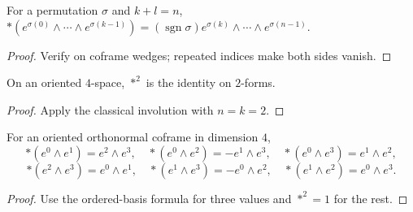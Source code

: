 \begin{proposition}
\label{prop:hodge-star-basis-wedge}





For a permutation $\sigma$ and $k+l=n$, $*(e^{\sigma(0)}\wedge\cdots\wedge e^{\sigma(k-1)})=(\operatorname{sgn}\sigma)e^{\sigma(k)}\wedge\cdots\wedge e^{\sigma(n-1)}$.
\end{proposition}
\begin{proof}

\sketch Verify on coframe wedges; repeated indices make both sides vanish.
\end{proof}

\begin{proposition}
\label{prop:hodge-star-two-involution}





On an oriented $4$-space, $*^2$ is the identity on $2$-forms.
\end{proposition}
\begin{proof}

\sketch Apply the classical involution with $n=k=2$.
\end{proof}

\begin{proposition}
\label{prop:hodge-star-euclidean-pair}





For an oriented orthonormal coframe in dimension $4$,
\[
{*}(e^0\wedge e^1)=e^2\wedge e^3,\quad {*}(e^0\wedge e^2)=-e^1\wedge e^3,\quad {*}(e^0\wedge e^3)=e^1\wedge e^2,
\]
\[
{*}(e^2\wedge e^3)=e^0\wedge e^1,\quad {*}(e^1\wedge e^3)=-e^0\wedge e^2,\quad {*}(e^1\wedge e^2)=e^0\wedge e^3.
\]
\end{proposition}
\begin{proof}

\sketch Use the ordered-basis formula for three values and $*^2=1$ for the rest.
\end{proof}

